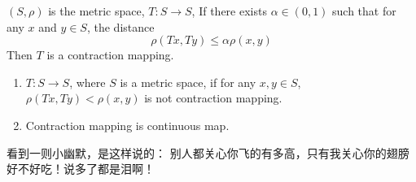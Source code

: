 \documentclass[color=green,mathpazo,titlestyle=hang,11pt]{elegantbook}
\begin{document}
\lipsum[6]
\begin{newdef}
$(S,\rho)$ is the metric space, $T: S\to S$, If there exists $\alpha\in(0,1)$ such that for any $x$ and $y\in S$, the distance
\begin{equation}
\rho(Tx,Ty)\leq \alpha\rho(x,y)
\end{equation}
Then $T$ is a {\color{main} contraction mapping}.
\end{newdef}

\begin{remark}
\begin{enumerate}
\parskip=0pt \itemsep=0pt
\item $T:S\to S$, where $S$ is a metric space, if  for any $x,y\in S$, $\rho(Tx,Ty)<\rho(x,y)$ is not contraction mapping.
\item Contraction mapping is continuous map.
\end{enumerate}
\end{remark}


\begin{conclusion}
看到一则小幽默，是这样说的：{\color{main} 别人都关心你飞的有多高，只有我关心你的翅膀好不好吃！}说多了都是泪啊！
\end{conclusion}




\end{document}
